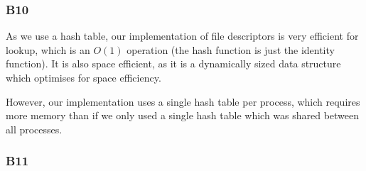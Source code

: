 \documentclass[a4wide, 11pt]{article}
\begin{document}
\subsubsection{B10}

As we use a hash table, our implementation of file descriptors is very efficient for lookup, which is an $O(1)$ operation (the hash function is just the identity function). It is also space efficient, as it is a dynamically sized data structure which optimises for space efficiency.

However, our implementation uses a single hash table per process, which requires more memory than if we only used a single hash table which was shared between all processes.

\subsubsection{B11}
\end{document}
